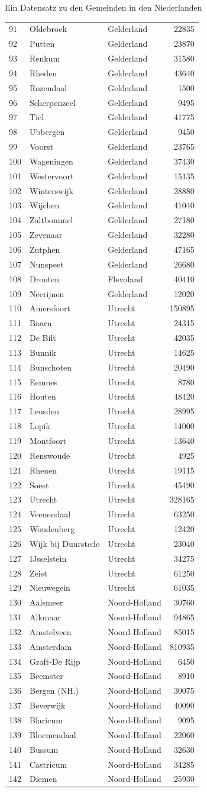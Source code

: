 \documentclass[ignorenonframetext,]{beamer}
\begin{document}
\begin{frame}[fragile]{Ein Datensatz zu den Gemeinden in den
Niederlanden}
\begin{longtable}[]{@{}lllr@{}}
91 & Oldebroek & Gelderland & 22835\tabularnewline
92 & Putten & Gelderland & 23870\tabularnewline
93 & Renkum & Gelderland & 31580\tabularnewline
94 & Rheden & Gelderland & 43640\tabularnewline
95 & Rozendaal & Gelderland & 1500\tabularnewline
96 & Scherpenzeel & Gelderland & 9495\tabularnewline
97 & Tiel & Gelderland & 41775\tabularnewline
98 & Ubbergen & Gelderland & 9450\tabularnewline
99 & Voorst & Gelderland & 23765\tabularnewline
100 & Wageningen & Gelderland & 37430\tabularnewline
101 & Westervoort & Gelderland & 15135\tabularnewline
102 & Winterswijk & Gelderland & 28880\tabularnewline
103 & Wijchen & Gelderland & 41040\tabularnewline
104 & Zaltbommel & Gelderland & 27180\tabularnewline
105 & Zevenaar & Gelderland & 32280\tabularnewline
106 & Zutphen & Gelderland & 47165\tabularnewline
107 & Nunspeet & Gelderland & 26680\tabularnewline
108 & Dronten & Flevoland & 40410\tabularnewline
109 & Neerijnen & Gelderland & 12020\tabularnewline
110 & Amersfoort & Utrecht & 150895\tabularnewline
111 & Baarn & Utrecht & 24315\tabularnewline
112 & De Bilt & Utrecht & 42035\tabularnewline
113 & Bunnik & Utrecht & 14625\tabularnewline
114 & Bunschoten & Utrecht & 20490\tabularnewline
115 & Eemnes & Utrecht & 8780\tabularnewline
116 & Houten & Utrecht & 48420\tabularnewline
117 & Leusden & Utrecht & 28995\tabularnewline
118 & Lopik & Utrecht & 14000\tabularnewline
119 & Montfoort & Utrecht & 13640\tabularnewline
120 & Renswoude & Utrecht & 4925\tabularnewline
121 & Rhenen & Utrecht & 19115\tabularnewline
122 & Soest & Utrecht & 45490\tabularnewline
123 & Utrecht & Utrecht & 328165\tabularnewline
124 & Veenendaal & Utrecht & 63250\tabularnewline
125 & Woudenberg & Utrecht & 12420\tabularnewline
126 & Wijk bij Duurstede & Utrecht & 23040\tabularnewline
127 & IJsselstein & Utrecht & 34275\tabularnewline
128 & Zeist & Utrecht & 61250\tabularnewline
129 & Nieuwegein & Utrecht & 61035\tabularnewline
130 & Aalsmeer & Noord-Holland & 30760\tabularnewline
131 & Alkmaar & Noord-Holland & 94865\tabularnewline
132 & Amstelveen & Noord-Holland & 85015\tabularnewline
133 & Amsterdam & Noord-Holland & 810935\tabularnewline
134 & Graft-De Rijp & Noord-Holland & 6450\tabularnewline
135 & Beemster & Noord-Holland & 8910\tabularnewline
136 & Bergen (NH.) & Noord-Holland & 30075\tabularnewline
137 & Beverwijk & Noord-Holland & 40090\tabularnewline
138 & Blaricum & Noord-Holland & 9095\tabularnewline
139 & Bloemendaal & Noord-Holland & 22060\tabularnewline
140 & Bussum & Noord-Holland & 32630\tabularnewline
141 & Castricum & Noord-Holland & 34285\tabularnewline
142 & Diemen & Noord-Holland & 25930\tabularnewline

\end{longtable}
\end{frame}
\end{document}
